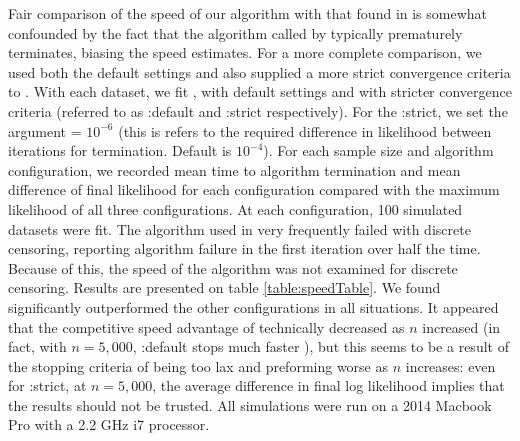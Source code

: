 \documentclass[article]{jss}
\begin{document}
	Fair comparison of the speed of our algorithm with that found in  is somewhat confounded by the fact that the algorithm called by  typically prematurely terminates, biasing the speed estimates. For a more complete comparison, we used both the default settings and also supplied a more strict convergence criteria to . With each dataset, we fit ,  with default settings and  with stricter convergence criteria (referred to as :default and :strict respectively). For the :strict, we set the argument  = $10^{-6}$ (this is refers to the required difference in likelihood between iterations for termination. Default is $10^{-4}$). For each sample size and algorithm configuration, we recorded mean time to algorithm termination and mean difference of final likelihood for each configuration compared with the maximum likelihood of all three configurations. At each configuration, 100 simulated datasets were fit. The algorithm used in  very frequently failed with discrete censoring, reporting algorithm failure in the first iteration over half the time. Because of this, the speed of the  algorithm was not examined for discrete censoring. Results are presented on table \ref{table:speedTable}.  We found  significantly outperformed the other configurations in all situations. It appeared that the competitive speed advantage of  technically decreased as $n$ increased (in fact, with $n = 5,000$, :default stops much faster ), but this seems to be a result of the stopping criteria of  being too lax and preforming worse as $n$ increases: even for :strict, at $n = 5,000$, the average difference in final log likelihood implies that the results should not be trusted. All simulations were run on a 2014 Macbook Pro with a 2.2 GHz i7 processor. 
	
	
\end{document}
